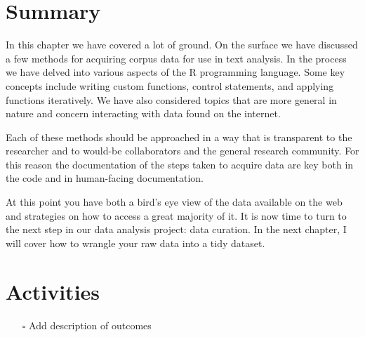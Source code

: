 \documentclass[
  letterpaper,
  DIV=11,
  numbers=noendperiod]{scrreport}
\providecommand{\tightlist}{%
  \setlength{\itemsep}{0pt}\setlength{\parskip}{0pt}}\usepackage{longtable,booktabs,array}
\theoremstyle{definition}
\theoremstyle{remark}
\begin{document}
\hypertarget{summary-4}{%
\section*{Summary}\label{summary-4}}


In this chapter we have covered a lot of ground. On the surface we have
discussed a few methods for acquiring corpus data for use in text
analysis. In the process we have delved into various aspects of the R
programming language. Some key concepts include writing custom
functions, control statements, and applying functions iteratively. We
have also considered topics that are more general in nature and concern
interacting with data found on the internet.

Each of these methods should be approached in a way that is transparent
to the researcher and to would-be collaborators and the general research
community. For this reason the documentation of the steps taken to
acquire data are key both in the code and in human-facing documentation.

At this point you have both a bird's eye view of the data available on
the web and strategies on how to access a great majority of it. It is
now time to turn to the next step in our data analysis project: data
curation. In the next chapter, I will cover how to wrangle your raw data
into a tidy dataset.

\hypertarget{activities-3}{%
\section*{Activities}\label{activities-3}}


\begin{itemize}
\tightlist
\item[$\square$]
   Add description of outcomes
\end{itemize}
\end{document}
